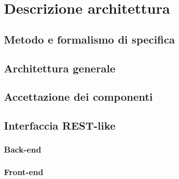 \section{Descrizione architettura }
	\subsection{Metodo e formalismo di specifica}

	\subsection{Architettura generale}

	\subsection{Accettazione dei componenti}

	\subsection{Interfaccia REST-like}

	\subsubsection{Back-end}
	\subsubsection{Front-end}
